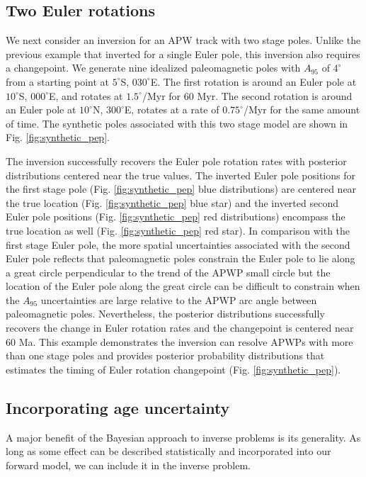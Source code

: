 \documentclass[11pt,letterpaper]{article}
\begin{document}
\subsection*{Two Euler rotations}
\label{sec:two_stage_poles}
We next consider an inversion for an APW track with two stage poles. Unlike the previous example that inverted for a single Euler pole, this inversion also requires a changepoint. We generate nine idealized paleomagnetic poles with $A_{95}$ of $4^\circ$ from a starting point at $5^\circ$S, $030^\circ$E. The first rotation is around an Euler pole at $10^\circ$S, $000^\circ$E, and rotates at $1.5^\circ$/Myr for 60 Myr. The second rotation is around an Euler pole at $10^\circ$N, $300^\circ$E, rotates at a rate of $0.75^\circ$/Myr for the same amount of time. The synthetic poles associated with this two stage model are shown in Fig. \ref{fig:synthetic_pep}. 

The inversion successfully recovers the Euler pole rotation rates with posterior distributions centered near the true values. The inverted Euler pole positions for the first stage pole (Fig. \ref{fig:synthetic_pep} blue distributions) are centered near the true location (Fig. \ref{fig:synthetic_pep} blue star) and the inverted second Euler pole positions (Fig. \ref{fig:synthetic_pep} red distributions) encompass the true location as well (Fig. \ref{fig:synthetic_pep} red star). In comparison with the first stage Euler pole, the more spatial uncertainties associated with the second Euler pole reflects that paleomagnetic poles constrain the Euler pole to lie along a great circle perpendicular to the trend of the APWP small circle but the location of the Euler pole along the great circle can be difficult to constrain when the $A_{95}$ uncertainties are large relative to the APWP arc angle between paleomagnetic poles. Nevertheless, the posterior distributions successfully recovers the change in Euler rotation rates and the changepoint is centered near 60 Ma. This example demonstrates the inversion can resolve APWPs with more than one stage poles and provides posterior probability distributions that estimates the timing of Euler rotation changepoint (Fig. \ref{fig:synthetic_pep}).

\subsection*{Incorporating age uncertainty}
\label{sec:age_uncertainty}
A major benefit of the Bayesian approach to inverse problems is its generality. As long as some effect can be described statistically and incorporated into our forward model, we can include it in the inverse problem.
\end{document}
